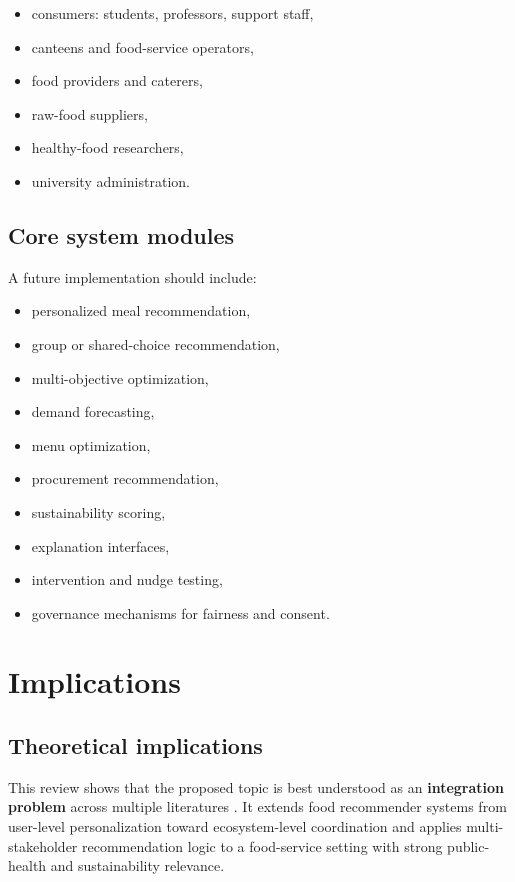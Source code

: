 \documentclass[journal]{IEEEtran}
\begin{document}
\begin{itemize}
\tightlist
\item
  consumers: students, professors, support staff,
\item
  canteens and food-service operators,
\item
  food providers and caterers,
\item
  raw-food suppliers,
\item
  healthy-food researchers,
\item
  university administration.
\end{itemize}

\subsection{Core system modules}\label{core-system-modules}

A future implementation should include:

\begin{itemize}
\tightlist
\item
  personalized meal recommendation,
\item
  group or shared-choice recommendation,
\item
  multi-objective optimization,
\item
  demand forecasting,
\item
  menu optimization,
\item
  procurement recommendation,
\item
  sustainability scoring,
\item
  explanation interfaces,
\item
  intervention and nudge testing,
\item
  governance mechanisms for fairness and consent.
\end{itemize}

\section{Implications}\label{implications}

\subsection{Theoretical implications}\label{theoretical-implications}

This review shows that the proposed topic is best understood as an
\textbf{integration problem} across multiple literatures
\cite{bondevik2024, zheng2017msr, peixoto2026sustainability}. It
extends food recommender systems from user-level personalization toward
ecosystem-level coordination and applies multi-stakeholder
recommendation logic to a food-service setting with strong public-health
and sustainability relevance.
\end{document}
